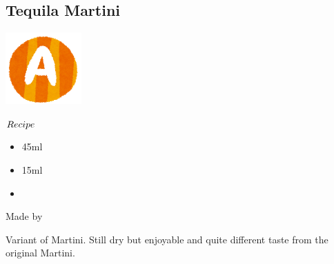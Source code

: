 \subsection{Tequila Martini}
\vspace{-7mm}
\hspace{47mm}
\includegraphics[scale=.12]{capital_a.png}
\vspace{2.5mm}
\begin{itembox}[l]{\boldmath $Recipe$}
\begin{itemize}
\setlength{\parskip}{0cm}
\setlength{\itemsep}{0cm}
\item \teq 45ml
\item \vermouth 15ml
\item {}
\end{itemize}
\vspace{-4mm}
Made by \stir
\end{itembox}
Variant of Martini. Still dry but enjoyable and quite different taste from the original Martini.
